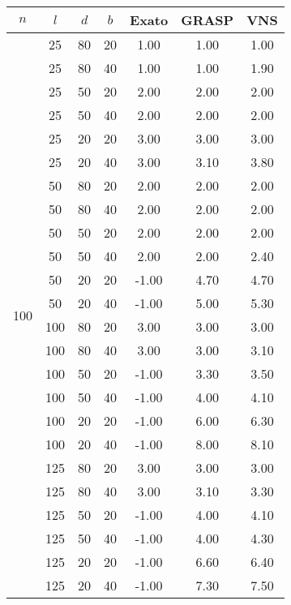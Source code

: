 \begin{tabular}{ |c|c|c|c||c c c| }
\hline
$ n $ & $ l $ & $ d $ & $ b $ & Exato & GRASP & VNS \\
\hline
\multirow{24}{*}{100} & 25 & 80 & 20 &   1.00 &   1.00 &   1.00 \\
& 25 & 80 & 40 &   1.00 &   1.00 &   1.90 \\
\cline{3-4}& 25 & 50 & 20 &   2.00 &   2.00 &   2.00 \\
& 25 & 50 & 40 &   2.00 &   2.00 &   2.00 \\
\cline{3-4}& 25 & 20 & 20 &   3.00 &   3.00 &   3.00 \\
& 25 & 20 & 40 &   3.00 &   3.10 &   3.80 \\
\cline{3-4}\cline{2-2}& 50 & 80 & 20 &   2.00 &   2.00 &   2.00 \\
& 50 & 80 & 40 &   2.00 &   2.00 &   2.00 \\
\cline{3-4}& 50 & 50 & 20 &   2.00 &   2.00 &   2.00 \\
& 50 & 50 & 40 &   2.00 &   2.00 &   2.40 \\
\cline{3-4}& 50 & 20 & 20 &  -1.00 &   4.70 &   4.70 \\
& 50 & 20 & 40 &  -1.00 &   5.00 &   5.30 \\
\cline{3-4}\cline{2-2}& 100 & 80 & 20 &   3.00 &   3.00 &   3.00 \\
& 100 & 80 & 40 &   3.00 &   3.00 &   3.10 \\
\cline{3-4}& 100 & 50 & 20 &  -1.00 &   3.30 &   3.50 \\
& 100 & 50 & 40 &  -1.00 &   4.00 &   4.10 \\
\cline{3-4}& 100 & 20 & 20 &  -1.00 &   6.00 &   6.30 \\
& 100 & 20 & 40 &  -1.00 &   8.00 &   8.10 \\
\cline{3-4}\cline{2-2}& 125 & 80 & 20 &   3.00 &   3.00 &   3.00 \\
& 125 & 80 & 40 &   3.00 &   3.10 &   3.30 \\
\cline{3-4}& 125 & 50 & 20 &  -1.00 &   4.00 &   4.10 \\
& 125 & 50 & 40 &  -1.00 &   4.00 &   4.30 \\
\cline{3-4}& 125 & 20 & 20 &  -1.00 &   6.60 &   6.40 \\
& 125 & 20 & 40 &  -1.00 &   7.30 &   7.50 \\
\cline{3-4}\cline{2-2}\cline{1-1}\hline
\end{tabular}
